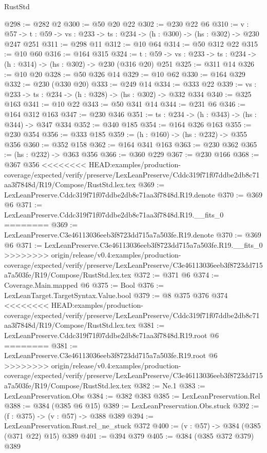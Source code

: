 \begin{lexlean}{RustStd}
\begin{coremodule}
{\begin{coremodule}
@298 := @282 @2
@300 := @50 @20 @22
@302 := @230 @22 @6
@310 := {v : @57} ->
  {t : @59} -> {vs : @233} -> {ts : @234} -> (h : @300) -> (hs : @302) -> @230 @247 @251
@311 := @298 @11
@312 := @10 @64
@314 := @50 @312 @22
@315 := @10 @60
@316 := @164 @315
@324 := {t : @59} -> {vs : @233} -> {ts : @234} -> (h : @314) -> (hs : @302) -> @230 (@316 @20) @251
@325 := @311 @14
@326 := @10 @20
@328 := @50 @326 @14
@329 := @10 @62
@330 := @164 @329
@332 := @230 (@330 @20)
@333 := @249 @14
@334 := @333 @22
@339 := {vs : @233} -> {ts : @234} -> (h : @328) -> (hs : @302) -> @332 @334
@340 := @325 @163
@341 := @10 @22
@343 := @50 @341 @14
@344 := @231 @6
@346 := @164 @312 @163
@347 := @230 @346
@351 := {ts : @234} -> (h : @343) -> (hs : @344) -> @347 @334
@352 := @340 @185
@354 := @164 @326 @163
@355 := @230 @354
@356 := @333 @185
@359 := (h : @160) -> (hs : @232) -> @355 @356
@360 := @352 @158
@362 := @164 @341 @163
@363 := @230 @362
@365 := (hs : @232) -> @363 @356
@366 := @360 @229
@367 := @230 @166
@368 := @367 @356
<<<<<<<< HEAD:examples/production-coverage/expected/verify/preserve/LexLeanPreserve/Cddc319f71f07ddbe2db8c71aa3f7848d/R19/Compose/RustStd.lex.tex
@369 := LexLeanPreserve.Cddc319f71f07ddbe2db8c71aa3f7848d.R19.denote
@370 := @369 @6
@371 := LexLeanPreserve.Cddc319f71f07ddbe2db8c71aa3f7848d.R19.__fits_0
========
@369 := LexLeanPreserve.C3e46113036eeb3f8723dd715a7a503fe.R19.denote
@370 := @369 @6
@371 := LexLeanPreserve.C3e46113036eeb3f8723dd715a7a503fe.R19.__fits_0
>>>>>>>> origin/release/v0.4:examples/production-coverage/expected/verify/preserve/LexLeanPreserve/C3e46113036eeb3f8723dd715a7a503fe/R19/Compose/RustStd.lex.tex
@372 := @371 @6
@374 := Coverage.Main.mapped @6
@375 := Bool
@376 := LexLeanTarget.TargetSyntax.Value.bool
@379 := @8 @375 @376 @374
<<<<<<<< HEAD:examples/production-coverage/expected/verify/preserve/LexLeanPreserve/Cddc319f71f07ddbe2db8c71aa3f7848d/R19/Compose/RustStd.lex.tex
@381 := LexLeanPreserve.Cddc319f71f07ddbe2db8c71aa3f7848d.R19.root @6
========
@381 := LexLeanPreserve.C3e46113036eeb3f8723dd715a7a503fe.R19.root @6
>>>>>>>> origin/release/v0.4:examples/production-coverage/expected/verify/preserve/LexLeanPreserve/C3e46113036eeb3f8723dd715a7a503fe/R19/Compose/RustStd.lex.tex
@382 := Ne.{1}
@383 := LexLeanPreservation.Obs
@384 := @382 @383
@385 := LexLeanPreservation.Rel
@388 := @384 (@385 @6 @15)
@389 := LexLeanPreservation.Obs.stuck
@392 := (f : @375) -> (v : @57) -> @388 @389
@394 := LexLeanPreservation.Rust.rel_ne_stuck @372
@400 := (v : @57) -> @384 (@385 (@371 @22) @15) @389
@401 := @394 @379
@405 := @384 (@385 @372 @379) @389

\end{coremodule}}
\end{coremodule}
\end{lexlean}
